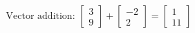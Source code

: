 \documentclass[preview]{standalone}
\begin{document}
\begin{align*}
\text{Vector addition: } \begin{bmatrix} 3 \\ 9 \end{bmatrix} + \begin{bmatrix} -2 \\ 2 \end{bmatrix} = \begin{bmatrix} 1 \\ 11 \end{bmatrix}
\end{align*}
\end{document}
